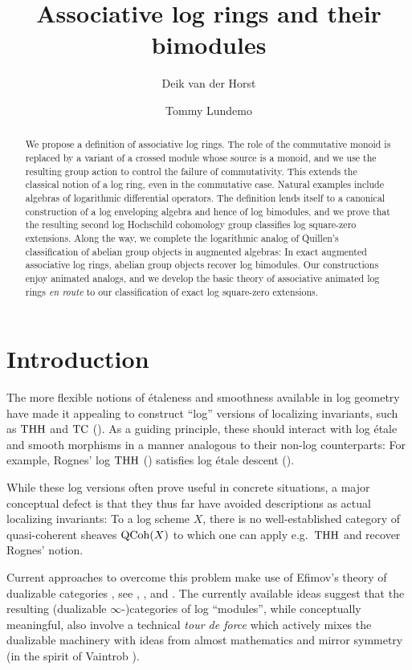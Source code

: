 \documentclass[a4paper,10pt%
]{amsart}
\title[]{Associative log rings and their bimodules}
\author{Deik van der Horst}
\author{Tommy Lundemo}
\numberwithin{equation}{section}
\theoremstyle{definition}
\renewcommand{\:}{\colon}
\begin{document}
\maketitle

\begin{abstract} We propose a definition of associative log rings. The role of the commutative monoid is replaced by a variant of a crossed module whose source is a monoid, and we use the resulting group action to control the failure of commutativity. This extends the classical notion of a log ring, even in the commutative case. Natural examples include algebras of logarithmic differential operators. The definition lends itself to a canonical construction of a log enveloping algebra and hence of log bimodules, and we prove that the resulting second log Hochschild cohomology group classifies log square-zero extensions. Along the way, we complete the logarithmic analog of Quillen's classification of abelian group objects in augmented algebras: In exact augmented associative log rings, abelian group objects recover log bimodules. Our constructions enjoy animated analogs, and we develop the basic theory of associative animated log rings \emph{en route} to our classification of exact log square-zero extensions.
\end{abstract}

\section{Introduction}

The more flexible notions of \'etaleness and smoothness available in log geometry have made it appealing to construct ``log'' versions of localizing invariants, such as ${\rm THH}$ and ${\rm TC}$ (\cites{Rog09, RSS26}). As a guiding principle, these should interact with log \'etale and smooth morphisms in a manner analogous to their non-log counterparts: For example, Rognes' log ${\rm THH}$ (\cite[Definition 8.11]{Rog09}) satisfies log \'etale descent (\cite[Theorem 1.7]{Lun21}). 

While these log versions often prove useful in concrete situations, a major conceptual defect is that they thus far have avoided descriptions as actual localizing invariants: To a log scheme $X$, there is no well-established category of quasi-coherent sheaves ${\rm QCoh}(X)$ to which one can apply e.g.\ ${\rm THH}$ and recover Rognes' notion.   

Current approaches to overcome this problem make use of Efimov's theory of dualizable categories \cite{Efi24}, see \cite[Conjecture 1.6]{Lun26}, \cite{Sch26}, and \cite{ABBS26}. The currently available ideas suggest that the resulting (dualizable $\infty$-)categories of log ``modules'', while conceptually meaningful, also involve a technical \emph{tour de force} which actively mixes the dualizable machinery with ideas from almost mathematics and mirror symmetry (in the spirit of Vaintrob \cite{Vai17}). 
\end{document}
